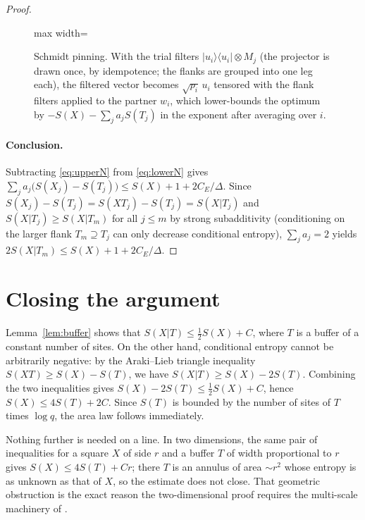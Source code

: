 \begin{proof}
\begin{figure}[t]
\centering
\begin{adjustbox}{max width=\linewidth}

\end{adjustbox}
\caption{Schmidt pinning. With the trial filters $|u_i\rangle\langle u_i|\otimes M_j$ (the projector is drawn once, by idempotence; the flanks are grouped into one leg each), the filtered vector becomes $\sqrt{p_i}\,u_i$ tensored with the flank filters applied to the partner $w_i$, which lower-bounds the optimum by $-S(X)-\sum_ja_jS(T_j)$ in the exponent after averaging over $i$.}\label{fig:pinning}
\end{figure}

\paragraph{Conclusion.}
Subtracting \eqref{eq:upperN} from \eqref{eq:lowerN} gives
$\sum_ja_j\bigl(S(X_j)-S(T_j)\bigr)\le S(X)+1+2C_E/\Delta$. Since
$S(X_j)-S(T_j)=S(XT_j)-S(T_j)=S(X|T_j)$ and $S(X|T_j)\ge S(X|T_m)$ for all
$j\le m$ by strong subadditivity (conditioning on the larger flank
$T_m\supseteq T_j$ can only decrease conditional entropy), $\sum_ja_j=2$
yields $2S(X|T_m)\le S(X)+1+2C_E/\Delta$.
\end{proof}

\section{Closing the argument}\label{sec:closing}

\begin{inwords}
Lemma~\ref{lem:buffer} shows that $S(X|T)\le\frac12S(X)+C$, where $T$ is a
buffer of a constant number of sites. On the other hand, conditional
entropy cannot be arbitrarily negative: by the Araki--Lieb triangle
inequality $S(XT)\ge S(X)-S(T)$, we have $S(X|T)\ge S(X)-2S(T)$. Combining
the two inequalities gives $S(X)-2S(T)\le\frac12S(X)+C$, hence
$S(X)\le 4S(T)+2C$. Since $S(T)$ is bounded by the number of sites of $T$
times $\log q$, the area law follows immediately.

Nothing further is needed on a line. In two dimensions, the same pair of
inequalities for a square $X$ of side $r$ and a buffer $T$ of width
proportional to $r$ gives $S(X)\le 4S(T)+Cr$; there $T$ is an annulus of
area $\sim r^2$ whose entropy is as unknown as that of $X$, so the
estimate does not close. That geometric obstruction is the exact reason
the two-dimensional proof requires the multi-scale machinery of \cite{AL}.
\end{inwords}

